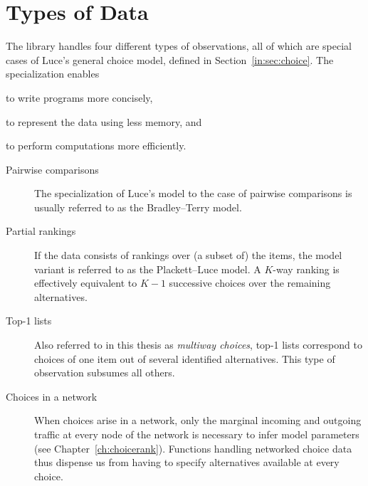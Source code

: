 \section{Types of Data}

The library handles four different types of observations, all of which are special cases of Luce's general choice model, defined in Section~\ref{in:sec:choice}.
The specialization enables
\begin{enuminline}
\item to write programs more concisely,
\item to represent the data using less memory, and
\item to perform computations more efficiently.
\end{enuminline}

\begin{description}
\item[Pairwise comparisons] The specialization of Luce's model to the case of pairwise comparisons is usually referred to as the Bradley--Terry model.

\item[Partial rankings] If the data consists of rankings over (a subset of) the items, the model variant is referred to as the Plackett--Luce model.
A $K$-way ranking is effectively equivalent to $K-1$ successive choices over the remaining alternatives.

\item[Top-1 lists] Also referred to in this thesis as \emph{multiway choices}, top-1 lists correspond to choices of one item out of several identified alternatives.
This type of observation subsumes all others.

\item[Choices in a network] When choices arise in a network, only the marginal incoming and outgoing traffic at every node of the network is necessary to infer model parameters (see Chapter~\ref{ch:choicerank}).
Functions handling networked choice data thus dispense us from having to specify alternatives available at every choice.
\end{description}
